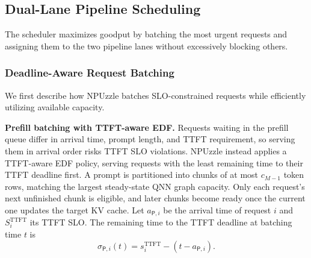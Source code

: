 \documentclass[sigconf,nonacm,10pt]{acmart}
\newcommand{\name}{NPUzzle\xspace}
\begin{document}

\subsection{Dual-Lane Pipeline Scheduling}  \label{sec:pipeline_schedule}
The scheduler maximizes goodput by batching the most urgent requests and assigning them to the two pipeline lanes without excessively blocking others.

\subsubsection{Deadline-Aware Request Batching} \label{sec:batching}
We first describe how \name batches SLO-constrained requests while efficiently utilizing available capacity.

\noindent\textbf{Prefill batching with TTFT-aware EDF.} \label{sec:batching_prefill}
Requests waiting in the prefill queue differ in arrival time, prompt length, and TTFT requirement, so serving them in arrival order risks TTFT SLO violations. \name instead applies a TTFT-aware EDF policy, serving requests with the least remaining time to their TTFT deadline first. A prompt is partitioned into chunks of at most $c_{M-1}$ token rows, matching the largest steady-state QNN graph capacity. Only each request's next unfinished chunk is eligible, and later chunks become ready once the current one updates the target KV cache.
Let $a_{\mathsf P, i}$ be the arrival time of request $i$ and $S_i^{\mathrm{TTFT}}$ its TTFT SLO. The remaining time to the TTFT deadline at batching time $t$ is
\begin{equation}\sigma_{\mathsf P,i}(t)=s_i^{\mathrm{TTFT}}-(t-a_{\mathsf P,i}).
\label{equ:prefill_slack}
\end{equation}
\end{document}
